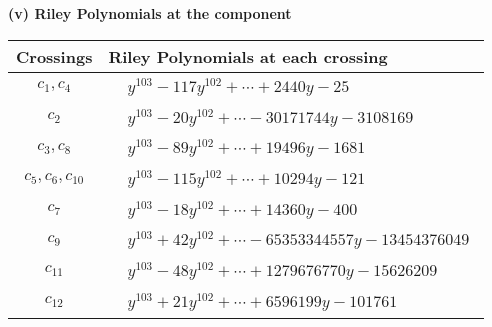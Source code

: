 \documentclass[1p]{elsarticle_modified}
\theoremstyle{definition}
\begin{document}
\newpage\renewcommand{\arraystretch}{1}
\flushleft \textbf{(v) Riley Polynomials at the component}\newline \\
\begin{tabular}{m{50pt}|m{274pt}}
Crossings & \hspace{64pt}Riley Polynomials at each crossing \\
\hline $$\begin{aligned}c_{1},c_{4}\end{aligned}$$&$\begin{aligned}
&y^{103}-117 y^{102}+\cdots+2440 y-25
\end{aligned}$\\
\hline $$\begin{aligned}c_{2}\end{aligned}$$&$\begin{aligned}
&y^{103}-20 y^{102}+\cdots-30171744 y-3108169
\end{aligned}$\\
\hline $$\begin{aligned}c_{3},c_{8}\end{aligned}$$&$\begin{aligned}
&y^{103}-89 y^{102}+\cdots+19496 y-1681
\end{aligned}$\\
\hline $$\begin{aligned}c_{5},c_{6},c_{10}\end{aligned}$$&$\begin{aligned}
&y^{103}-115 y^{102}+\cdots+10294 y-121
\end{aligned}$\\
\hline $$\begin{aligned}c_{7}\end{aligned}$$&$\begin{aligned}
&y^{103}-18 y^{102}+\cdots+14360 y-400
\end{aligned}$\\
\hline $$\begin{aligned}c_{9}\end{aligned}$$&$\begin{aligned}
&y^{103}+42 y^{102}+\cdots-65353344557 y-13454376049
\end{aligned}$\\
\hline $$\begin{aligned}c_{11}\end{aligned}$$&$\begin{aligned}
&y^{103}-48 y^{102}+\cdots+1279676770 y-15626209
\end{aligned}$\\
\hline $$\begin{aligned}c_{12}\end{aligned}$$&$\begin{aligned}
&y^{103}+21 y^{102}+\cdots+6596199 y-101761
\end{aligned}$\\
\hline
\end{tabular}\\~\\
\end{document}
